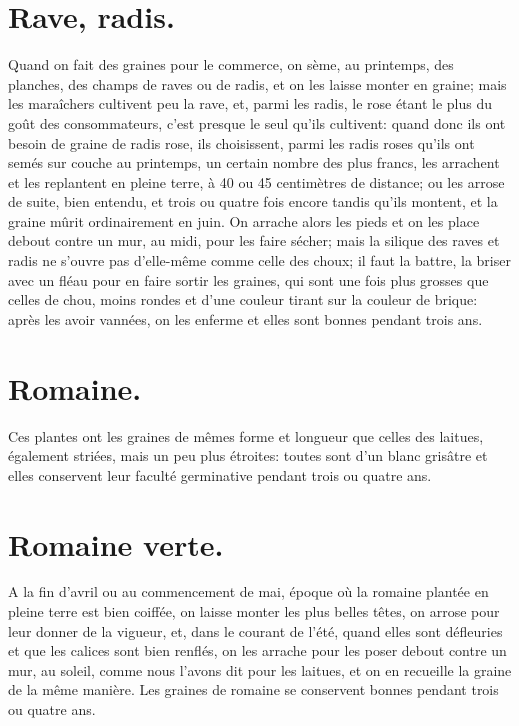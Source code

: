 \documentclass[10pt,a4paper]{book}
\begin{document}
\section{Rave, radis.}

Quand on fait des graines pour le commerce, on sème, au printemps, des planches, des champs de raves ou de radis, et on les laisse monter en graine; mais les maraîchers cultivent peu la rave, et, parmi les radis, le rose étant le plus du goût des consommateurs, c'est presque le seul qu'ils cultivent: quand donc ils ont besoin de graine de radis rose, ils choisissent, parmi les radis roses qu'ils ont semés sur couche au printemps, un certain nombre des plus francs, les arrachent et les replantent en pleine terre, à 40 ou 45 centimètres de distance; ou les arrose de suite, bien entendu, et trois ou quatre fois encore tandis qu'ils montent, et la graine mûrit ordinairement en juin. On arrache alors les pieds et on les place debout contre un mur, au midi, pour les faire sécher; mais la silique des raves et radis ne s'ouvre pas d'elle-même comme celle des choux; il faut la battre, la briser avec un fléau pour en faire sortir les graines, qui sont une fois plus grosses que celles de chou, moins rondes et d'une couleur tirant sur la couleur de brique: après les avoir vannées, on les enferme et elles sont bonnes pendant trois ans.

\section{Romaine.}

Ces plantes ont les graines de mêmes forme et longueur que celles des laitues, également striées, mais un peu plus étroites: toutes sont d'un blanc grisâtre et elles conservent leur faculté germinative pendant trois ou quatre ans.

\section{Romaine verte.}

A la fin d'avril ou au commencement de mai, époque où la romaine plantée en pleine terre est bien coiffée, on laisse monter les plus belles têtes, on arrose pour leur donner de la vigueur, et, dans le courant de l'été, quand elles sont défleuries et que les calices sont bien renflés, on les arrache pour les poser debout contre un mur, au soleil, comme nous l'avons dit pour les laitues, et on en recueille la graine de la même manière. Les graines de romaine se conservent bonnes pendant trois ou quatre ans.
\end{document}
